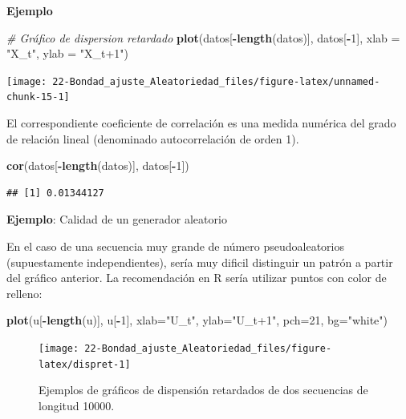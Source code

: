 \documentclass[
]{book}
\newenvironment{Shaded}{\begin{snugshade}}{\end{snugshade}}
\newcommand{\CommentTok}[1]{\textcolor[rgb]{0.56,0.35,0.01}{\textit{#1}}}
\newcommand{\DataTypeTok}[1]{\textcolor[rgb]{0.13,0.29,0.53}{#1}}
\newcommand{\DecValTok}[1]{\textcolor[rgb]{0.00,0.00,0.81}{#1}}
\newcommand{\KeywordTok}[1]{\textcolor[rgb]{0.13,0.29,0.53}{\textbf{#1}}}
\newcommand{\NormalTok}[1]{#1}
\newcommand{\OperatorTok}[1]{\textcolor[rgb]{0.81,0.36,0.00}{\textbf{#1}}}
\newcommand{\StringTok}[1]{\textcolor[rgb]{0.31,0.60,0.02}{#1}}
\theoremstyle{break}
\theoremstyle{definition}
\theoremstyle{definition}
\theoremstyle{definition}
\theoremstyle{remark}
\begin{document}
\textbf{Ejemplo}

\begin{Shaded}
\begin{Highlighting}[]
\CommentTok{# Gráfico de dispersion retardado}
\KeywordTok{plot}\NormalTok{(datos[}\OperatorTok{-}\KeywordTok{length}\NormalTok{(datos)], datos[}\OperatorTok{-}\DecValTok{1}\NormalTok{], }\DataTypeTok{xlab =} \StringTok{"X_t"}\NormalTok{, }\DataTypeTok{ylab =} \StringTok{"X_t+1"}\NormalTok{)}
\end{Highlighting}
\end{Shaded}

\begin{center}\texttt{[image: 22-Bondad\_ajuste\_Aleatoriedad\_files/figure-latex/unnamed-chunk-15-1]} \end{center}

El correspondiente coeficiente de correlación es una medida numérica
del grado de relación lineal (denominado autocorrelación de orden 1).

\begin{Shaded}
\begin{Highlighting}[]
\KeywordTok{cor}\NormalTok{(datos[}\OperatorTok{-}\KeywordTok{length}\NormalTok{(datos)], datos[}\OperatorTok{-}\DecValTok{1}\NormalTok{])}
\end{Highlighting}
\end{Shaded}

\begin{verbatim}
## [1] 0.01344127
\end{verbatim}

\textbf{Ejemplo}: Calidad de un generador aleatorio

En el caso de una secuencia muy grande de número pseudoaleatorios (supuestamente independientes), sería muy dificil distinguir un patrón a partir del gráfico anterior. La recomendación en R sería utilizar puntos con color de relleno:

\begin{Shaded}
\begin{Highlighting}[]
\KeywordTok{plot}\NormalTok{(u[}\OperatorTok{-}\KeywordTok{length}\NormalTok{(u)], u[}\OperatorTok{-}\DecValTok{1}\NormalTok{], }\DataTypeTok{xlab=}\StringTok{"U_t"}\NormalTok{, }\DataTypeTok{ylab=}\StringTok{"U_t+1"}\NormalTok{, }\DataTypeTok{pch=}\DecValTok{21}\NormalTok{, }\DataTypeTok{bg=}\StringTok{"white"}\NormalTok{)}
\end{Highlighting}
\end{Shaded}

\begin{figure}[!htb]

{\centering \texttt{[image: 22-Bondad\_ajuste\_Aleatoriedad\_files/figure-latex/dispret-1]} 

}

\caption{Ejemplos de gráficos de dispensión retardados de dos secuencias de longitud 10000.}\label{fig:dispret}
\end{figure}
\end{document}
